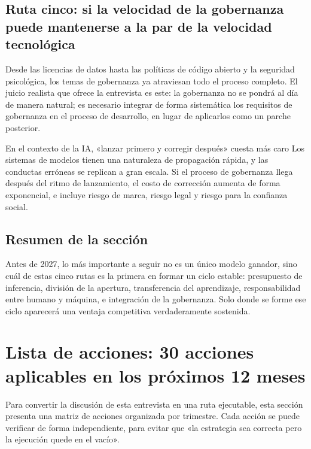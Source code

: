 \documentclass[a4paper]{article}
\begin{document}
\subsection{Ruta cinco: si la velocidad de la gobernanza puede mantenerse a la par de la velocidad tecnológica}

Desde las licencias de datos hasta las políticas de código abierto y la seguridad psicológica, los temas de gobernanza ya atraviesan todo el proceso completo. El juicio realista que ofrece la entrevista es este: la gobernanza no se pondrá al día de manera natural; es necesario integrar de forma sistemática los requisitos de gobernanza en el proceso de desarrollo, en lugar de aplicarlos como un parche posterior.

\begin{warningbox}{En el contexto de la IA, «lanzar primero y corregir después» cuesta más caro}
Los sistemas de modelos tienen una naturaleza de propagación rápida, y las conductas erróneas se replican a gran escala. Si el proceso de gobernanza llega después del ritmo de lanzamiento, el costo de corrección aumenta de forma exponencial, e incluye riesgo de marca, riesgo legal y riesgo para la confianza social.
\end{warningbox}

\subsection{Resumen de la sección}

Antes de 2027, lo más importante a seguir no es un único modelo ganador, sino cuál de estas cinco rutas es la primera en formar un ciclo estable: presupuesto de inferencia, división de la apertura, transferencia del aprendizaje, responsabilidad entre humano y máquina, e integración de la gobernanza. Solo donde se forme ese ciclo aparecerá una ventaja competitiva verdaderamente sostenida.

\section{Lista de acciones: 30 acciones aplicables en los próximos 12 meses}

Para convertir la discusión de esta entrevista en una ruta ejecutable, esta sección presenta una matriz de acciones organizada por trimestre. Cada acción se puede verificar de forma independiente, para evitar que «la estrategia sea correcta pero la ejecución quede en el vacío».
\end{document}
